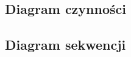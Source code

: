\documentclass[12pt, letterpaper]{article}
\begin{document}
		\subsection{Diagram czynności}
		
		\subsection{Diagram sekwencji}


 
\end{document}
